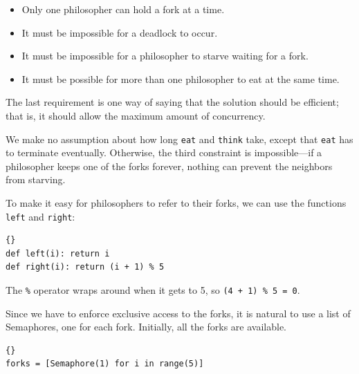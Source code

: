 \documentclass{book}
\begin{document}
\begin{itemize}

\item Only one philosopher can hold a fork at a time.

\item It must be impossible for a deadlock to occur.

\item It must be impossible for a philosopher to starve waiting
for a fork.

\item It must be possible for more than one philosopher
to eat at the same time.

\end{itemize}

The last requirement is one way of saying that the solution
should be efficient; that is, it should allow the maximum amount
of concurrency.

We make no assumption about how long {\tt eat} and {\tt think} take,
except that {\tt eat} has to terminate eventually.  Otherwise, the
third constraint is impossible---if a philosopher keeps one of the
forks forever, nothing can prevent the neighbors from starving.

To make it easy for philosophers to refer to their forks,
we can use the functions {\tt left} and {\tt right}:

\begin{latin}
\begin{latin}
\begin{lstlisting}[title={Which fork?}]{}
def left(i): return i
def right(i): return (i + 1) % 5
\end{lstlisting}
\end{latin}
\end{latin}

The {\tt \%} operator wraps around when it gets to 5, so
{\tt (4 + 1) \% 5 = 0}.

Since we have to enforce exclusive access to the forks,
it is natural to use a list of Semaphores, one for
each fork.  Initially, all the forks are available.

\begin{latin}
\begin{latin}
\begin{lstlisting}[title={Variables for dining philosophers}]{}
forks = [Semaphore(1) for i in range(5)]
\end{lstlisting}
\end{latin}
\end{latin}
\end{document}
